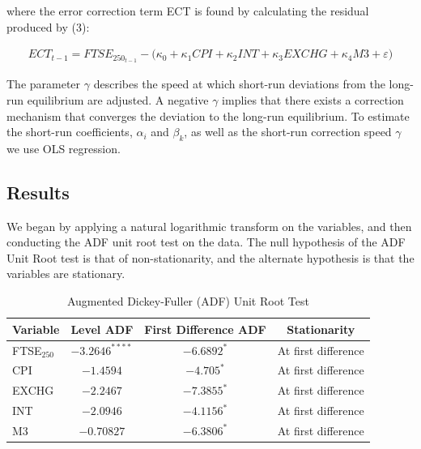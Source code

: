 \documentclass[11pt,a4paper]{article}
\begin{document}
where the error correction term ECT is found by calculating the residual 
produced by (3):

\begin{align*}
    ECT_{t-1} = FTSE_{250_{t-1}} - \biggl(\kappa_0 + \kappa_1 CPI + \kappa_2 INT + \kappa_3 EXCHG + \kappa_4 M3 + \varepsilon \biggr)
\end{align*}

The parameter $\gamma$ describes the speed at which short-run deviations from the long-run equilibrium
are adjusted. A negative $\gamma$ implies that there exists a correction mechanism that converges the deviation 
to the long-run equilibrium. To estimate the short-run coefficients, $\alpha_i$ and $\beta_k$, as 
well as the short-run correction speed $\gamma$ we use OLS regression.

\subsection{Results}

We began by applying a natural logarithmic transform on the variables, and 
then conducting the ADF unit root test on the data. The null hypothesis of the 
ADF Unit Root test is that of non-stationarity, and the alternate hypothesis 
is that the variables are stationary.


\begin{table}[h!]
    \centering
    \caption{Augmented Dickey-Fuller (ADF) Unit Root Test}
    \begin{tabular}{lccc}
        \toprule
        \textbf{Variable} & \textbf{Level ADF} & \textbf{First Difference ADF} & \textbf{Stationarity} \\
        \midrule
        FTSE$_{250}$ & $-3.2646^{****}$ & $-6.6892^{*}$ & At first difference \\
        CPI          & $-1.4594$ & $-4.705^{*}$ & At first difference \\
        EXCHG        & $-2.2467$ & $-7.3855^{*}$ & At first difference \\
        INT          & $-2.0946$ & $-4.1156^{*}$ & At first difference \\
        M3           & $-0.70827$ & $-6.3806^{*}$ & At first difference \\
        \bottomrule
    \end{tabular}
\end{table}
\end{document}
